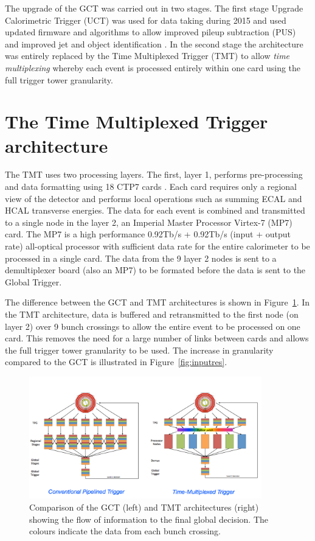 The upgrade of the GCT was carried out in two stages. The first stage
Upgrade Calorimetric Trigger (UCT) was used for data taking during 2015
and used updated firmware and algorithms to allow improved pileup subtraction (PUS)
and improved jet and object identification \cite{uct}. In the second stage the 
architecture was entirely replaced by the Time Multiplexed Trigger (TMT) 
to allow \emph{time multiplexing} whereby each
event is processed entirely within one card using the full trigger tower granularity. 

\section{The Time Multiplexed Trigger architecture}

The TMT uses two processing layers. The first, layer 1, performs
pre-processing and data formatting using 18 CTP7 cards \cite{mp7}. Each card requires
only a regional view of the detector and performs local operations such as summing 
ECAL and HCAL transverse energies. The data for each event is combined and transmitted to 
a single node in the layer 2, an Imperial Master Processor Virtex-7 (MP7) card. 
The MP7 is a high performance 0.92Tb/s + 0.92Tb/s (input + output rate) all-optical processor \cite{mp7}
with sufficient data rate for the entire calorimeter to be processed in a single card. The data 
from the 9 layer 2 nodes is sent to a demultiplexer board (also an MP7) to be formated before
the data is sent to the Global Trigger.

The difference between the GCT and TMT architectures is shown in Figure~\ref{tmux}. 
In the TMT architecture, data is buffered and retransmitted to the first node (on layer 2)
over 9 bunch crossings to allow the entire event to be processed on one card. This
removes the need for a large number of links between cards and allows the full trigger
tower granularity to be used. The increase in granularity compared to the GCT is
illustrated in Figure~\ref{fig:inputres}. 

\begin{figure}

\centering
    \includegraphics[width=0.9\textwidth]{./Figures/triggerUpgrade/tmux}
  \caption{Comparison of the GCT (left) and TMT architectures (right) showing the flow of information
  to the final global decision. The colours indicate the data from each bunch crossing. \cite{tmt}}
  \label{tmux}
\end{figure}

